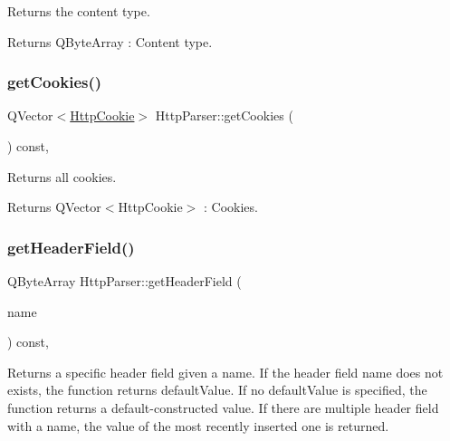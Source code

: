 Returns the content type. 

\begin{DoxyReturn}{Returns}
Q\+Byte\+Array \+: Content type. 
\end{DoxyReturn}
\mbox{\label{class_http_parser_ac6ff3fd106a47dc7821723d451c8f9ad}} 
\subsubsection{\texorpdfstring{get\+Cookies()}{getCookies()}}
{\footnotesize\ttfamily Q\+Vector$<$\hyperlink{class_http_cookie}{Http\+Cookie}$>$ Http\+Parser\+::get\+Cookies (\begin{DoxyParamCaption}{ }\end{DoxyParamCaption}) const\hspace{0.3cm}{\ttfamily [inline]}, {\ttfamily [noexcept]}}



Returns all cookies. 

\begin{DoxyReturn}{Returns}
Q\+Vector$<$\+Http\+Cookie$>$ \+: Cookies. 
\end{DoxyReturn}
\mbox{\label{class_http_parser_adabda41fe6457ab14b573a32085c2eea}} 
\subsubsection{\texorpdfstring{get\+Header\+Field()}{getHeaderField()}}
{\footnotesize\ttfamily Q\+Byte\+Array Http\+Parser\+::get\+Header\+Field (\begin{DoxyParamCaption}\item[{const Q\+Byte\+Array \&}]{name }\end{DoxyParamCaption}) const\hspace{0.3cm}{\ttfamily [inline]}, {\ttfamily [noexcept]}}



Returns a specific header field given a name. If the header field name does not exists, the function returns default\+Value. If no default\+Value is specified, the function returns a default-\/constructed value. If there are multiple header field with a name, the value of the most recently inserted one is returned. 


